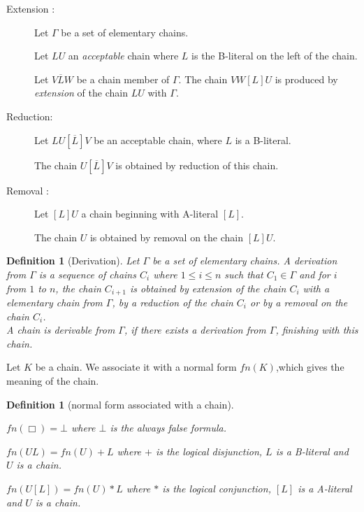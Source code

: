 \documentclass{article}
\newtheorem{definition}[theoreme]{Definition}
\begin{document}
\begin{description}
\item [Extension :]
Let $\Gamma$ be a set of elementary chains. 

Let $L U$ an \emph{acceptable} chain where $L$ is the B-literal on the left of the chain.

Let $V \overline{L} W$ be a chain member of $\Gamma$.
The chain  $VW[L]U$ is produced by \emph{extension} of the chain $LU$ with $\Gamma$.


\item [Reduction:]
Let $L U [\overline{L}] V$ be an acceptable chain, where $L$ is a B-literal.

The chain $U [\overline{L}]V$ is obtained by reduction of this chain.


\item [Removal :]
Let $[L] U$ a chain beginning with A-literal $[L]$.

The chain $U$ is obtained by removal on the chain $[L]U$.


\end{description}

\begin{definition}[Derivation]\label{derivation1}
Let $\Gamma$ be a set of elementary chains. A derivation from $\Gamma$ is a sequence of chains $C_i$ where $1 \leq i \leq n$
such that $C_1 \in \Gamma$ and for $i$ from $1$ to $n$, the chain $C_{i+1}$ is obtained by extension of the chain $C_i$ with
a elementary chain from $\Gamma$, by a reduction of the chain $C_i$ or by a removal on the chain $C_i$.\\
A chain is derivable from $\Gamma$, if there exists a derivation from $\Gamma$, finishing with this chain.
\end{definition}

Let $K$ be a chain. We associate it with a normal form $fn(K)$,which gives the meaning of the chain. 

\begin{definition}[normal form associated with a chain]\ 
\begin{itemrond}
\item $fn(\Box)=\bot$ where $\bot$ is the always false formula.
\item $fn(UL)= fn(U)+L$ where $+$ is the logical disjunction, $L$ is a B-literal and $U$ is a chain.
\item $fn(U[L])=fn(U)*L$ where $*$ is the logical conjunction, $[L]$ is a A-literal and $U$ is a chain.
\end{itemrond}
\end{definition}
\end{document}
